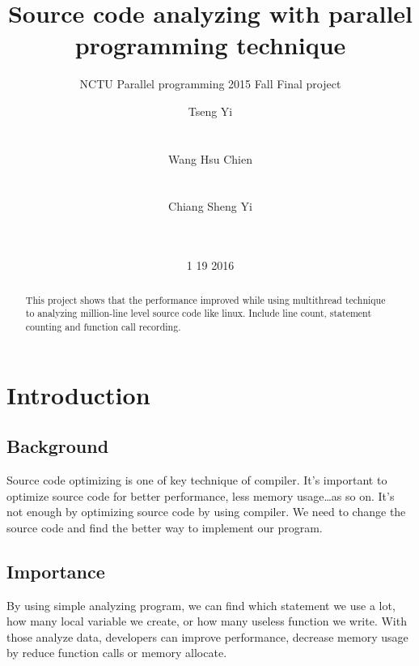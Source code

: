 \documentclass{acm_proc_article-sp}
\begin{document}
\title{Source code analyzing with parallel programming technique}
\subtitle{NCTU Parallel programming 2015 Fall Final project}

\author{
\alignauthor
Tseng Yi\\
       \\
       \\
\alignauthor
Wang Hsu Chien\\
       \\
       \\
\alignauthor
Chiang Sheng Yi\\
       \\
       \\
}

\date{1 19 2016}

\maketitle
\begin{abstract}
       This project shows that the performance improved while using multithread technique
       to analyzing million-line level source code like linux. Include line count, statement counting
       and function call recording.
\end{abstract}


\section{Introduction}
\subsection{Background}
       Source code optimizing is one of key technique of compiler. 
       It's important to optimize source code for better performance, 
       less memory usage\ldots as so on. It's not enough by optimizing 
       source code by using compiler. We need to change the source 
       code and find the better way to implement our program. 

\subsection{Importance}
	By using simple analyzing program, we can find which statement we 
	use a lot, how many local variable we create, or how many useless 
	function we write. With those analyze data, developers can improve performance,
	decrease memory usage by reduce function calls or memory allocate.
\end{document}

